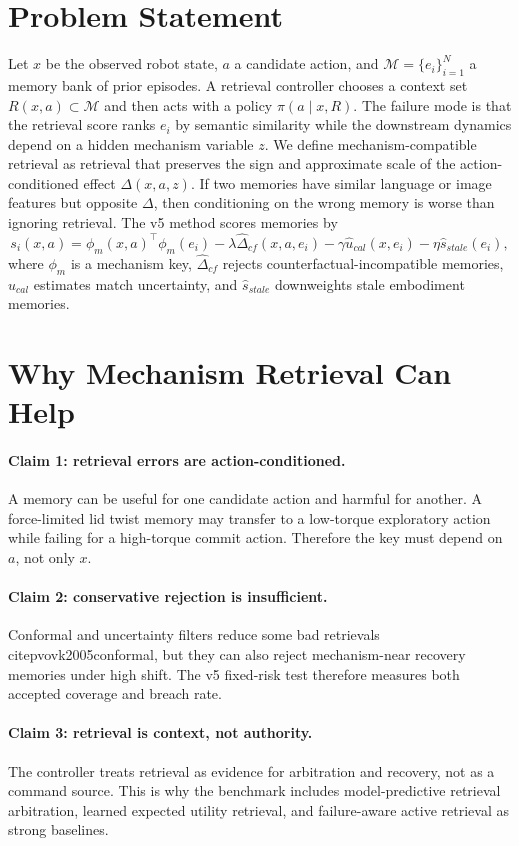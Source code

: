 \documentclass{article}
\begin{document}
\section{Problem Statement}
Let $x$ be the observed robot state, $a$ a candidate action, and $\mathcal{M}=\{e_i\}_{i=1}^N$ a memory bank of prior episodes. A retrieval controller chooses a context set $R(x,a)\subset \mathcal{M}$ and then acts with a policy $\pi(a\mid x,R)$. The failure mode is that the retrieval score ranks $e_i$ by semantic similarity while the downstream dynamics depend on a hidden mechanism variable $z$.
We define mechanism-compatible retrieval as retrieval that preserves the sign and approximate scale of the action-conditioned effect $\Delta(x,a,z)$. If two memories have similar language or image features but opposite $\Delta$, then conditioning on the wrong memory is worse than ignoring retrieval.
The v5 method scores memories by
\[
s_i(x,a)=\phi_m(x,a)^\top \phi_m(e_i)-\lambda \widehat{\Delta}_{cf}(x,a,e_i)-\gamma \widehat{u}_{cal}(x,e_i)-\eta \widehat{s}_{stale}(e_i),
\]
where $\phi_m$ is a mechanism key, $\widehat{\Delta}_{cf}$ rejects counterfactual-incompatible memories, $\widehat{u}_{cal}$ estimates match uncertainty, and $\widehat{s}_{stale}$ downweights stale embodiment memories.
\section{Why Mechanism Retrieval Can Help}
\paragraph{Claim 1: retrieval errors are action-conditioned.} A memory can be useful for one candidate action and harmful for another. A force-limited lid twist memory may transfer to a low-torque exploratory action while failing for a high-torque commit action. Therefore the key must depend on $a$, not only $x$.
\paragraph{Claim 2: conservative rejection is insufficient.} Conformal and uncertainty filters reduce some bad retrievals \\citep{vovk2005conformal}, but they can also reject mechanism-near recovery memories under high shift. The v5 fixed-risk test therefore measures both accepted coverage and breach rate.
\paragraph{Claim 3: retrieval is context, not authority.} The controller treats retrieval as evidence for arbitration and recovery, not as a command source. This is why the benchmark includes model-predictive retrieval arbitration, learned expected utility retrieval, and failure-aware active retrieval as strong baselines.
\end{document}
